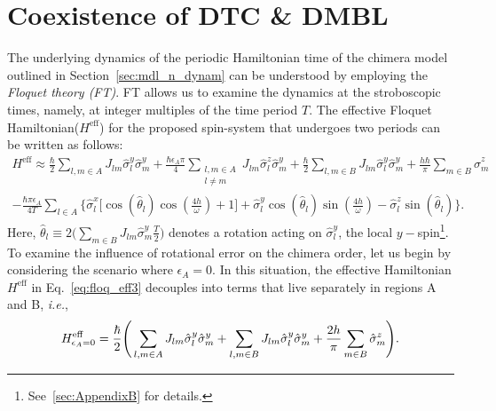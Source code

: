 \documentclass[12pt]{iopart}
\begin{document}
\section{\label{sec:level3}Coexistence of DTC \& DMBL}	
The underlying dynamics of the periodic Hamiltonian time of the chimera model outlined in Section~\ref{sec:mdl_n_dynam} can be understood by employing the \textit{ Floquet theory (FT)}. FT allows us to examine the dynamics at the stroboscopic times, namely, at integer multiples of the time period $T$. The effective Floquet Hamiltonian($H^{\mathrm{eff}}$) for the proposed spin-system that undergoes two periods can be written as follows:
\begin{multline}
    H^{\mathrm{eff}} \approx\frac{\hbar}{2} \sum_{l,m\in A}J_{lm}\hat{\sigma}_l^y\hat{\sigma}_m^y +\frac{\hbar \epsilon_A \pi}{4} \sum_{\substack{l,m\in A\\l\neq m}} J_{lm}\hat{\sigma}^z_l\hat{\sigma}^y_m + \frac{\hbar}{2}\sum_{l,m\in B}J_{lm}\hat{\sigma}_l^y \hat{\sigma}_m^y + \frac{h\hbar}{\pi}\sum_{m \in B}\hat{\sigma}^z_m \\ -\frac{\hbar \pi \epsilon_A}{4T}\sum_{l\in A}\Bigg\{\hat{\sigma}^x_l \bigg[\cos(\hat{\theta}_l)\cos(\frac{4h}{\omega})+1 \bigg] + \hat{\sigma}^y_l \cos(\hat{\theta}_l)\sin(\frac{4h}{\omega})-\hat{\sigma}^z_l \sin(\hat{\theta}_l)\Bigg\}.
    \label{eq:floq_eff3}
\end{multline}
Here, $\displaystyle \hat{\theta}_l \equiv 2 \Big(\sum_{m \in B}J_{lm}\hat{\sigma}^y_m \frac{T}{2} \Big)$ denotes a rotation acting on $\hat{\sigma}^y_l$, the local $y-$spin\footnote{See~\ref{sec:AppendixB} for details.}. 
To examine the influence of rotational error on the chimera order, let us begin by considering the scenario where $\epsilon_A=0$. In this situation, the effective Hamiltonian $H^\mathrm{eff}$ in Eq.~\eqref{eq:floq_eff3}  decouples into terms that live separately in regions A and B, \textit{i.e.},
\begin{equation}
    H^{\mathrm{eff}}_{\epsilon_A=0} =  \frac{\hbar}{2}\Bigg( \sum_{l,m\in A} J_{lm} \hat{\sigma}^y_l\hat{\sigma}^y_m +\sum_{l,m\in B} J_{lm} \hat{\sigma}^y_l\hat{\sigma}^y_m\\+\frac{2h }{\pi}\sum_{m \in B}\hat{\sigma}^z_m\Bigg).
\end{equation}
	
\end{document}
